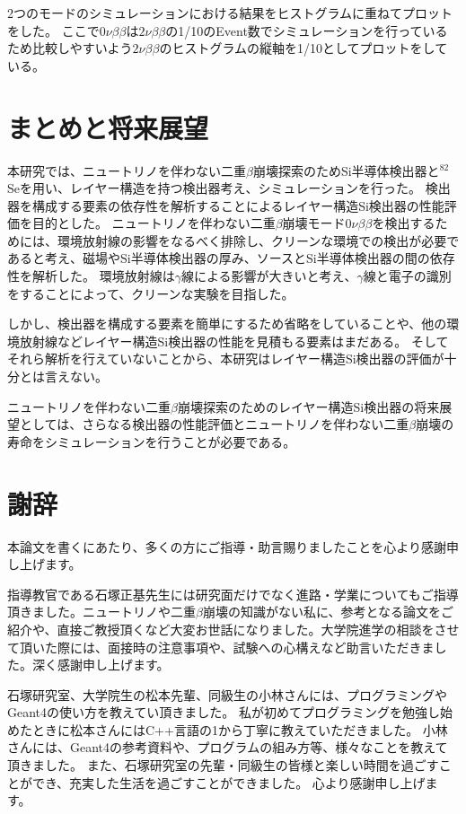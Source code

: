 \documentclass[a4paper,10pt]{jreport}
\begin{document}
2つのモードのシミュレーションにおける結果をヒストグラムに重ねてプロットをした。
ここで$0\nu\beta\beta$は$2\nu\beta\beta$の1/10のEvent数でシミュレーションを行っているため比較しやすいよう$2\nu\beta\beta$のヒストグラムの縦軸を1/10としてプロットをしている。




\chapter*{まとめと将来展望}

本研究では、ニュートリノを伴わない二重$\beta$崩壊探索のためSi半導体検出器と$^{82}$Seを用い、レイヤー構造を持つ検出器考え、シミュレーションを行った。
検出器を構成する要素の依存性を解析することによるレイヤー構造Si検出器の性能評価を目的とした。
ニュートリノを伴わない二重$\beta$崩壊モード$0\nu\beta\beta$を検出するためには、環境放射線の影響をなるべく排除し、クリーンな環境での検出が必要であると考え、磁場やSi半導体検出器の厚み、ソースとSi半導体検出器の間の依存性を解析した。
環境放射線は$\gamma$線による影響が大きいと考え、$\gamma$線と電子の識別をすることによって、クリーンな実験を目指した。

しかし、検出器を構成する要素を簡単にするため省略をしていることや、他の環境放射線などレイヤー構造Si検出器の性能を見積もる要素はまだある。
そしてそれら解析を行えていないことから、本研究はレイヤー構造Si検出器の評価が十分とは言えない。

ニュートリノを伴わない二重$\beta$崩壊探索のためのレイヤー構造Si検出器の将来展望としては、さらなる検出器の性能評価とニュートリノを伴わない二重$\beta$崩壊の寿命をシミュレーションを行うことが必要である。



\chapter*{謝辞}

本論文を書くにあたり、多くの方にご指導・助言賜りましたことを心より感謝申し上げます。

指導教官である石塚正基先生には研究面だけでなく進路・学業についてもご指導頂きました。ニュートリノや二重$\beta$崩壊の知識がない私に、参考となる論文をご紹介や、直接ご教授頂くなど大変お世話になりました。大学院進学の相談をさせて頂いた際には、面接時の注意事項や、試験への心構えなど助言いただきました。深く感謝申し上げます。

石塚研究室、大学院生の松本先輩、同級生の小林さんには、プログラミングやGeant4の使い方を教えてい頂きました。
私が初めてプログラミングを勉強し始めたときに松本さんにはC++言語の1から丁寧に教えていただきました。
小林さんには、Geant4の参考資料や、プログラムの組み方等、様々なことを教えて頂きました。
また、石塚研究室の先輩・同級生の皆様と楽しい時間を過ごすことができ、充実した生活を過ごすことができました。
心より感謝申し上げます。
\end{document}
